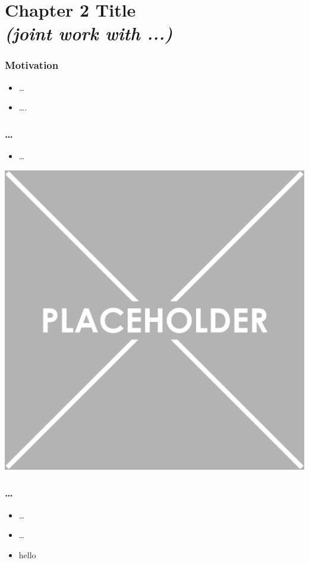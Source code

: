 
\section{Chapter 2 Title \\\textit{(joint work with ...)}}

\begin{frame}[t]\frametitle{Motivation}
    \begin{itemize}[<+->]
        \item \ldots
        \item \ldots \citep{Abbring2007}.
    \end{itemize}
\end{frame}

\begin{frame}\frametitle{\ldots}
    \begin{itemize}
        \item \ldots
    \end{itemize}
    \begin{center}
        \includegraphics[height=.5\textwidth]{figures/placeholder}
    \end{center}
\end{frame}

\begin{frame}[t]
    \frametitle{\ldots}
    \begin{itemize}
        \item<1-> \ldots
        \item<2->[$\Rightarrow$] \ldots \vspace{1em}
        \item<3-> hello 
    \end{itemize}
\end{frame}
